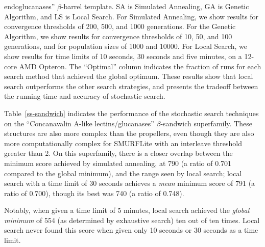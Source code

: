 \documentclass{acm_proc_article-sp}
\begin{document}
\begin{small}
\begin{table}[htb]
{endoglucanases'' $\beta$-barrel template. 
SA is Simulated Annealing, GA is Genetic Algorithm, and LS is Local Search. 
For Simulated Annealing, we show results for convergence thresholds of
200, 500, and 1000 generations. 
For the Genetic Algorithm, we show results for convergence thresholds of 10, 
50, and 100 generations, and for population sizes of 1000 and 10000.
For Local Search, we show results for time limits of 10 seconds, 30 seconds and 
five minutes, on a 12-core AMD Opteron.
The ``Optimal'' column indicates the fraction of runs for each search method
that achieved the global optimum.
These results show that local search outperforms the other search strategies,
and presents the tradeoff between the running time and accuracy of stochastic 
search.}
\end{table}
\end{small}

Table~\ref{ss-sandwich} indicates the performance of the stochastic
search techniques on the ``Concanavalin A-like lectins/glucanases'' 
$\beta$-sandwich superfamily.
These structures are also more complex than the propellers, even though they 
are also more computationally complex for SMURFLite with an interleave 
threshold greater than 2. 
On this superfamily, there is a closer overlap between the minimum score 
achieved by simulated annealing, at 790 (a ratio of 0.701 compared to the 
global minimum), and the range seen by local search;
local search with a time limit of 30 seconds achieves a \emph{mean} minimum
score of 791 (a ratio of 0.700), though its best was 740 (a ratio of 0.748).

Notably, when given a time limit of 5 minutes, local search achieved the 
\emph{global minimum} of 554 (as determined by exhaustive search) ten out of 
ten times. Local search never found this score when given only 10 seconds or
30 seconds as a time limit.
\end{document}

